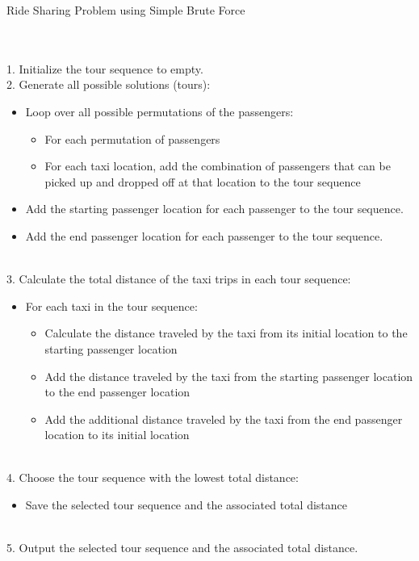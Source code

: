 \documentclass{article}
\begin{document}
\newpage
\begin{algorithm}
\caption{Ride Sharing Problem using Simple Brute Force}\label{alg:two}
\\
\\ 1. Initialize the tour sequence to empty.
\\ 2. Generate all possible solutions (tours):
    \begin{itemize}
        \item Loop over all possible permutations of the passengers:
        \begin{itemize}
            \item For each permutation of passengers
            \item For each taxi location, add the combination of passengers that can be picked up and dropped off at that location to the tour sequence
        \end{itemize}
        \item Add the starting passenger location for each passenger to the tour sequence.
        \item Add the end passenger location for each passenger to the tour sequence.
    \end{itemize}
\\ 3. Calculate the total distance of the taxi trips in each tour sequence:
    \begin{itemize}
        \item For each taxi in the tour sequence:
        \begin{itemize}
            \item Calculate the distance traveled by the taxi from its initial location to the starting passenger location
            \item Add the distance traveled by the taxi from the starting passenger location to the end passenger location
            \item Add the additional distance traveled by the taxi from the end passenger location to its initial location
        \end{itemize}
    \end{itemize}
\\ 4. Choose the tour sequence with the lowest total distance:
    \begin{itemize}
        \item Save the selected tour sequence and the associated total distance
    \end{itemize}
\\ 5. Output the selected tour sequence and the associated total distance.
    

  
\end{algorithm}
 
\end{document}
